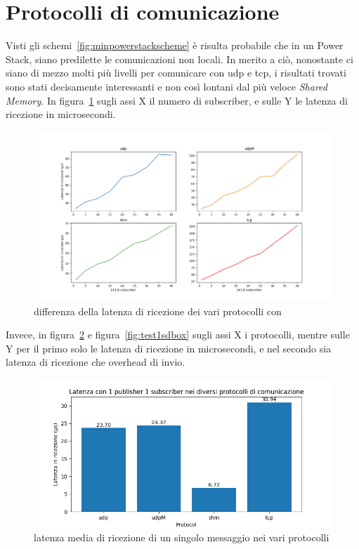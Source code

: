 \section{Protocolli di comunicazione}
Visti gli schemi~\ref{fig:minpowerstackscheme} è risulta probabile che in un Power Stack, siano predilette le comunicazioni non locali. In merito a ciò, nonostante ci siano di mezzo molti più livelli per comunicare con udp e tcp, i risultati trovati sono stati decisamente interessanti e non così lontani dal più veloce \emph{Shared Memory}. 
In figura~\ref{fig:test3_different_protocols} sugli assi X il numero di subscriber, e sulle Y le latenza di ricezione in microsecondi.
\begin{figure}[H]
    \includegraphics[width=\textwidth]{./results/test3_different_protocol_send_receive.png} 
        \caption{differenza della latenza di ricezione dei vari protocolli con }\label{fig:test3_different_protocols}
\end{figure}
Invece, in figura~\ref{fig:test3_different_protocols2} e figura~\ref{fig:test1sdbox} sugli assi X i protocolli, mentre sulle Y per il primo solo le latenza di ricezione in microsecondi, e nel secondo sia latenza di ricezione che overhead di invio.
\begin{figure}[H]
    \includegraphics[width=\textwidth]{./results/test1_bar_sr_1p1s.png} 
        \caption{latenza media di ricezione di un singolo messaggio nei vari protocolli}\label{fig:test3_different_protocols2}%
\end{figure}

